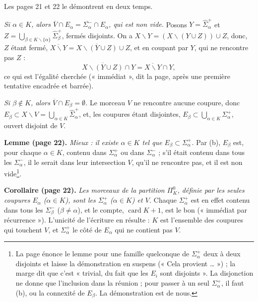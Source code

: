 \documentclass[11pt,a4paper]{article}
\begin{document}
Les pages 21 et 22 le démontrent en deux temps.

\emph{Si $\alpha \in K$, alors $\overline{V} \cap E_\alpha =
\overline{\Sigma_\alpha^{-}} \cap E_\alpha$, qui est non vide.} Posons $Y =
\widehat{\Sigma}_\alpha^{+}$ et $Z = \bigcup_{\beta \in K \smallsetminus
\{\alpha\}} \widehat{\Sigma}_\beta^{+}$, fermés disjoints. On a $X
\smallsetminus Y = (X \smallsetminus (Y \cup Z)) \cup Z$, donc, $Z$ étant
fermé, $\overline{X \smallsetminus Y} = \overline{X \smallsetminus (Y \cup
Z)} \cup Z$, et en coupant par $Y$, qui ne rencontre pas $Z$ :
\[
\overline{X \smallsetminus (Y \cup Z)} \cap Y = \overline{X \smallsetminus Y}
\cap Y ,
\]
ce qui est l'égalité cherchée (« immédiat », dit la page, après une première
tentative encadrée et barrée).

\emph{Si $\beta \notin K$, alors $\overline{V} \cap E_\beta = \emptyset$.} Le
morceau $V$ ne rencontre aucune coupure, donc $E_\beta \subset X
\smallsetminus V = \bigcup_{\alpha \in K} \widehat{\Sigma}_\alpha^{+}$, et,
les coupures étant disjointes, $E_\beta \subset \bigcup_{\alpha \in K}
\Sigma_\alpha^{+}$, ouvert disjoint de $V$.

\textbf{Lemme (page 22).} \emph{Mieux : il existe $\alpha \in K$ tel que
$E_\beta \subset \Sigma_\alpha^{+}$.} Par (b), $E_\beta$ est, pour chaque
$\alpha \in K$, contenu dans $\Sigma_\alpha^{+}$ ou dans $\Sigma_\alpha^{-}$ ;
s'il était contenu dans tous les $\Sigma_\alpha^{-}$, il le serait dans leur
intersection $V$, qu'il ne rencontre pas, et il est non vide\footnote{La page
énonce le lemme pour une famille quelconque de $\Sigma_\alpha^{+}$ deux à
deux disjoints et laisse la démonstration en suspens (« Cela provient
… ») ; la marge dit que c'est « trivial, du fait que les $E_i$ sont
disjoints ». La disjonction ne donne que l'inclusion dans la réunion ; pour
passer à un seul $\Sigma_\alpha^{+}$, il faut (b), ou la connexité de
$E_\beta$. La démonstration est de nous.}.

\textbf{Corollaire (page 22).} \emph{Les morceaux de la partition
$\Pi_K^0$, définie par les seules coupures $E_\alpha$ ($\alpha \in K$), sont
les $\Sigma_\alpha^{+}$ ($\alpha \in K$) et $V$.} Chaque $\Sigma_\alpha^{+}$
est en effet contenu dans tous les $\Sigma_\beta^{-}$ ($\beta \neq \alpha$),
et le compte, $\operatorname{card} K + 1$, est le bon (« immédiat par
récurrence »). L'unicité de l'écriture en résulte : $K$ est l'ensemble des
coupures qui touchent $V$, et $\Sigma_\alpha^{+}$ le côté de $E_\alpha$ qui
ne contient pas $V$.

\end{document}
